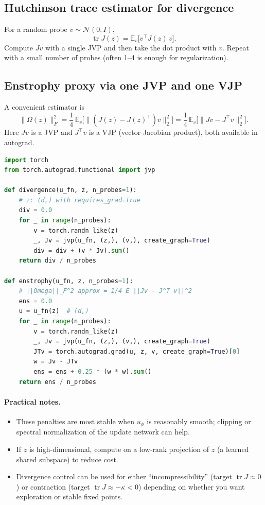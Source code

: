 \documentclass[11pt]{article}
\theoremstyle{definition}
\theoremstyle{plain}
\theoremstyle{remark}
\newcommand{\E}{\mathbb{E}}
\newcommand{\tr}{\operatorname{tr}}
\begin{document}
\subsection{Hutchinson trace estimator for divergence}
For a random probe $v\sim\mathcal{N}(0,I)$,
\[
\tr J(z)=\E_v\bigl[v^\top J(z)\,v\bigr].
\]
Compute $Jv$ with a single JVP and then take the dot product with $v$.
Repeat with a small number of probes (often 1--4 is enough for regularization).

\subsection{Enstrophy proxy via one JVP and one VJP}
A convenient estimator is
\[
\|\Omega(z)\|_F^2
=\frac14\,\E_v\bigl[\| (J(z)-J(z)^\top)v\|_2^2\bigr]
=\frac14\,\E_v\bigl[\|Jv - J^\top v\|_2^2\bigr].
\]
Here $Jv$ is a JVP and $J^\top v$ is a VJP (vector-Jacobian product), both available in autograd.

\begin{lstlisting}[language=Python,caption={Divergence and enstrophy regularizers for an update field $u_\phi$ in PyTorch},label={lst:fluid}]
import torch
from torch.autograd.functional import jvp

def divergence(u_fn, z, n_probes=1):
    # z: (d,) with requires_grad=True
    div = 0.0
    for _ in range(n_probes):
        v = torch.randn_like(z)
        _, Jv = jvp(u_fn, (z,), (v,), create_graph=True)
        div = div + (v * Jv).sum()
    return div / n_probes

def enstrophy(u_fn, z, n_probes=1):
    # ||Omega||_F^2 approx = 1/4 E ||Jv - J^T v||^2
    ens = 0.0
    u = u_fn(z)  # (d,)
    for _ in range(n_probes):
        v = torch.randn_like(z)
        _, Jv = jvp(u_fn, (z,), (v,), create_graph=True)
        JTv = torch.autograd.grad(u, z, v, create_graph=True)[0]
        w = Jv - JTv
        ens = ens + 0.25 * (w * w).sum()
    return ens / n_probes
\end{lstlisting}

\paragraph{Practical notes.}
\begin{itemize}[leftmargin=2em]
\item These penalties are most stable when $u_\phi$ is reasonably smooth; clipping or spectral normalization of the update network can help.
\item If $z$ is high-dimensional, compute on a low-rank projection of $z$ (a learned shared subspace) to reduce cost.
\item Divergence control can be used for either ``incompressibility'' (target $\tr J\approx 0$) or contraction (target $\tr J\approx -\kappa<0$) depending on whether you want exploration or stable fixed points.
\end{itemize}
\end{document}
